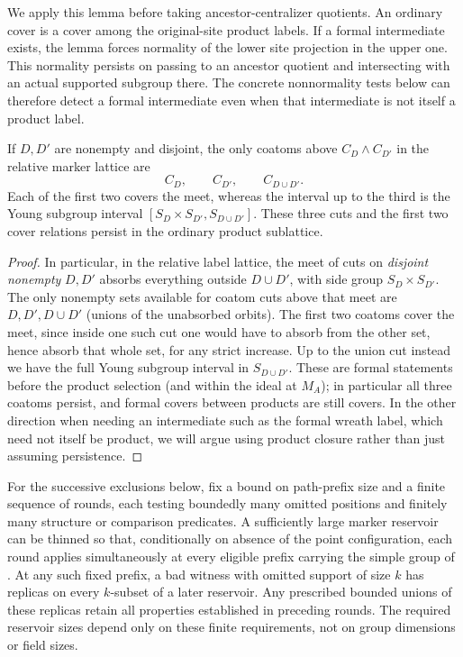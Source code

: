 We apply this lemma before taking ancestor-centralizer quotients.
An ordinary cover is a cover among the original-site product labels.
If a formal intermediate exists, the lemma forces normality of the
lower site projection in the upper one.  This normality persists on
passing to an ancestor quotient and intersecting with an actual
supported subgroup there.  The concrete nonnormality tests below can
therefore detect a formal intermediate even when that intermediate
is not itself a product label.

\begin{lemma}\label{fa:cut-meet}
If \(D,D'\) are nonempty and disjoint, the only coatoms above \(C_D\wedge C_{D'}\) in the relative marker lattice are
\[
 C_D,\qquad C_{D'},\qquad C_{D\cup D'}.
\]
Each of the first two covers the meet, whereas the interval up to the third is the Young subgroup
interval \([S_D\times S_{D'},S_{D\cup D'}]\).  These three cuts and the first two cover relations persist
in the ordinary product sublattice.
\end{lemma}

\begin{proof}

In particular, in the relative label lattice, the meet of cuts on \emph{disjoint nonempty} \(D,D'\)
absorbs everything outside \(D\cup D'\), with side group \(S_D\times S_{D'}\). The only nonempty sets
available for coatom cuts above that meet are \(D,D',D\cup D'\) (unions of the unabsorbed orbits). The
first two coatoms cover the meet, since inside one such cut one would have to absorb from the other set,
hence absorb that whole set, for any strict increase. Up to the union cut instead we have the full Young
subgroup interval in \(S_{D\cup D'}\). These are formal statements before the product selection (and
within the ideal at \(M_A\)); in particular all three coatoms persist, and formal covers between products
are still covers. In the other direction when needing an intermediate such as the formal wreath label,
which need not itself be product, we will argue using product closure rather than just assuming
persistence.

\end{proof}

\begin{lemma}\label{fa:all-ancestors}
For the successive exclusions below, fix a bound on path-prefix size and a finite sequence of rounds, each testing boundedly many
omitted positions and finitely many structure or comparison predicates.  A sufficiently large marker
reservoir can be thinned so that, conditionally on absence of the point configuration, each round applies
simultaneously at every eligible prefix carrying the simple group of .  At any
such fixed prefix, a bad witness with omitted support of size \(k\) has replicas on every \(k\)-subset of
a later reservoir.  Any prescribed bounded unions of these replicas retain all properties established in
preceding rounds.  The required reservoir sizes depend only on these finite requirements, not on group
dimensions or field sizes.
\end{lemma}

